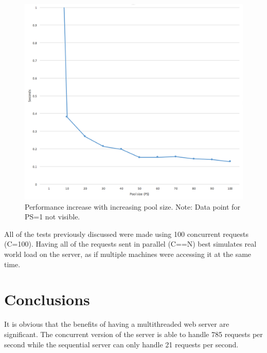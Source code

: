 \documentclass[a4paper, 11pt]{article}
\begin{document}
\begin{figure}[h]
  \begin{center}
    \includegraphics[width=\linewidth]{concurrent_poolsize_seconds.png}
    \caption{Performance increase with increasing pool size. Note: Data point for PS=1 not visible.}
    \label{fig:concurrent_poolsize_seconds}
  \end{center}
\end{figure}

All of the tests previously discussed were made using 100 concurrent requests (C=100). Having all of the requests sent in parallel (C==N) best simulates real world load on the server, as if multiple machines were accessing it at the same time.

\section{Conclusions}

It is obvious that the benefits of having a multithreaded web server are significant. The concurrent version of the server is able to handle 785 requests per second while the sequential server can only handle 21 requests per second.
\end{document}
